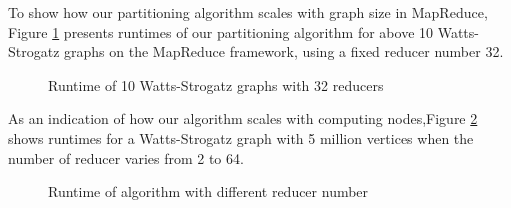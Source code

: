 \documentclass{acm_proc_article-sp}
\begin{document}
To show how our partitioning algorithm scales with graph size in MapReduce, Figure \ref{fig:runtime} presents runtimes of our partitioning algorithm for above 10 Watts-Strogatz graphs on the MapReduce framework, using a fixed reducer number 32.
\begin{figure}
\centering
{}
\caption{Runtime of 10 Watts-Strogatz graphs with 32 reducers }
\label{fig:runtime}
\end{figure}
As an indication of how our algorithm scales with computing nodes,Figure \ref{fig:reducerNum} shows runtimes for a Watts-Strogatz graph with 5 million vertices when the number of reducer varies from 2 to 64.
\begin{figure}
\centering
{}
\caption{Runtime of algorithm with different reducer number}
\label{fig:reducerNum}
\end{figure}
\end{document}
